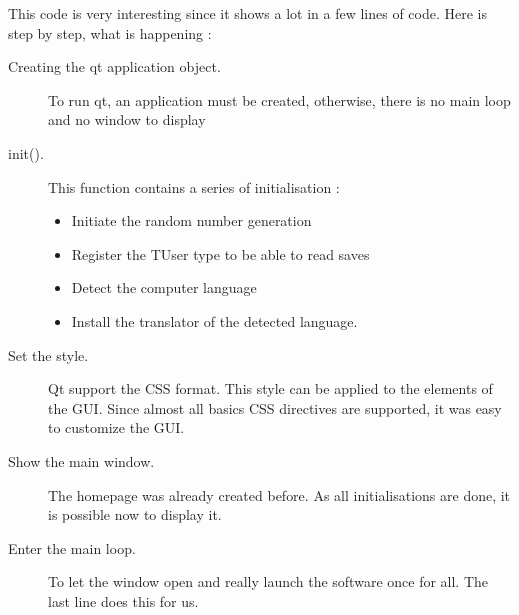 This code is very interesting since it shows a lot in a few lines of code. Here is step by step, what is happening :
\begin{description}
	\item[Creating the qt application object.] To run qt, an application must be created, otherwise, there is no main loop and no window to display
	\item[init().]  This function contains a series of initialisation :
	\begin{itemize}
		\item Initiate the random number generation
		\item Register the TUser type to be able to read saves
		\item Detect the computer language
		\item Install the translator of the detected language.
	\end{itemize}
	\item[Set the style.] Qt support the CSS format. This style can be applied to the elements of the GUI. Since almost all basics CSS directives are supported, it was easy to customize the GUI.
	\item[Show the main window.] The homepage was already created before. As all initialisations are done, it is possible now to display it.
	\item[Enter the main loop.] To let the window open and really launch the software once for all. The last line does this for us.
\end{description}


